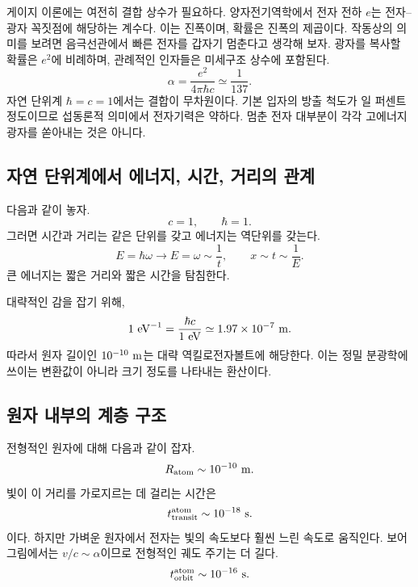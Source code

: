 게이지 이론에는 여전히 결합 상수가 필요하다. 양자전기역학에서 전자 전하 \(e\)는 전자--광자 꼭짓점에 해당하는 계수다. 이는 진폭이며, 확률은 진폭의 제곱이다. 작동상의 의미를 보려면 음극선관에서 빠른 전자를 갑자기 멈춘다고 생각해 보자. 광자를 복사할 확률은 \(e^2\)에 비례하며, 관례적인 인자들은 미세구조 상수에 포함된다.
\begin{equation}
\alpha=\frac{e^2}{4\pi\hbar c}
\simeq \frac{1}{137}.
\label{eq:l5-alpha}
\end{equation} 자연 단위계 \(\hbar=c=1\)에서는 결합이 무차원이다. 기본 입자의 방출 척도가 일 퍼센트 정도이므로 섭동론적 의미에서 전자기력은 약하다. 멈춘 전자 대부분이 각각 고에너지 광자를 쏟아내는 것은 아니다.

\subsection{자연 단위계에서 에너지, 시간, 거리의 관계}

다음과 같이 놓자.
\begin{equation}
c=1,
\qquad
\hbar=1.
\end{equation} 그러면 시간과 거리는 같은 단위를 갖고 에너지는 역단위를 갖는다.
\begin{equation}
E=\hbar\omega\longrightarrow E=\omega\sim\frac1t,
\qquad
x\sim t\sim\frac1E.
\end{equation} 큰 에너지는 짧은 거리와 짧은 시간을 탐침한다.

대략적인 감을 잡기 위해,
\begin{equation}
1\ {\rm eV}^{-1}
=\frac{\hbar c}{1\ {\rm eV}}
\simeq 1.97\times10^{-7}\ {\rm m}.
\end{equation} 따라서 원자 길이인 \(10^{-10}\ {\rm m}\)는 대략 역킬로전자볼트에 해당한다. 이는 정밀 분광학에 쓰이는 변환값이 아니라 크기 정도를 나타내는 환산이다.

\subsection{원자 내부의 계층 구조}

전형적인 원자에 대해 다음과 같이 잡자.
\begin{equation}
R_{\rm atom}\sim10^{-10}\ {\rm m}.
\end{equation} 빛이 이 거리를 가로지르는 데 걸리는 시간은
\begin{equation}
t_{\rm transit}^{\rm atom}\sim10^{-18}\ {\rm s}.
\end{equation}이다. 하지만 가벼운 원자에서 전자는 빛의 속도보다 훨씬 느린 속도로 움직인다. 보어 그림에서는 \(v/c\sim\alpha\)이므로 전형적인 궤도 주기는 더 길다.
\begin{equation}
t_{\rm orbit}^{\rm atom}\sim10^{-16}\ {\rm s}.
\end{equation}

